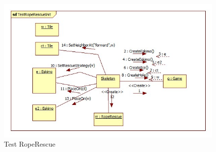 \begin{figure}[h]
	\begin{center}
		\includegraphics[width=17cm]{chapters/chapter05/diagrams/Test_RopeRescue_init.jpg}
		\caption{Test RopeRescue}
		\label{fig:Test RopeRescue}
	\end{center}
\end{figure}

